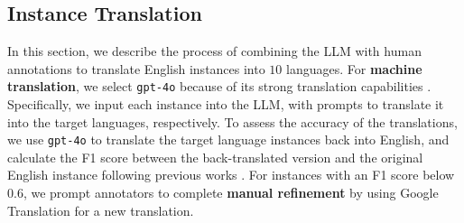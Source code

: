\subsection{Instance Translation}
\label{subsec:Instance Translation}
In this section, we describe the process of combining the LLM with human annotations to translate English instances into $10$ languages. 
For \textbf{machine translation}, we select \texttt{gpt-4o} because of its strong translation capabilities \cite{yan2024gpt4vshumantranslators,hu-etal-2024-gentranslate}. 
Specifically, we input each instance into the LLM, with prompts to translate it into the target languages, respectively. 
To assess the accuracy of the translations, we use \texttt{gpt-4o} to translate the target language instances back into English, and calculate the F1 score between the back-translated version and the original English instance following previous works \cite{peng-etal-2024-humanevalxl}. 
For instances with an F1 score below $0.6$, we prompt annotators to complete \textbf{manual refinement} by using Google Translation for a new translation.

